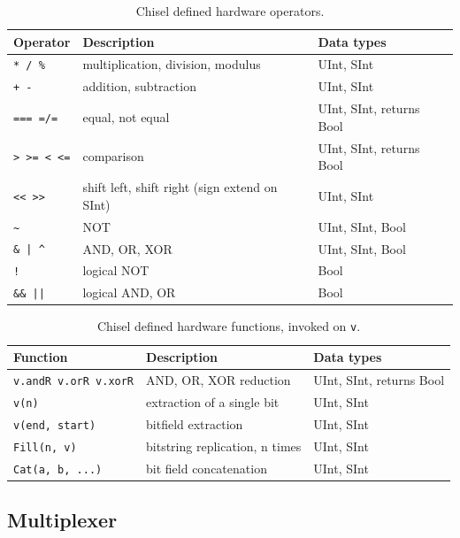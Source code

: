 \documentclass[%
    10pt,
    headinclude, footexclude,
    openright, %
    notitlepage,
    cleardoubleempty,
    headsepline,
    pointlessnumbers,
    bibtotoc, idxtotoc,
    ]{scrbook}
\newcommand{\code}[1]{{\small{\texttt{#1}}}}
\begin{document}
\begin{table}
 \centering
 \label{tab:operators}
  \begin{tabular}{lll}
    \toprule
    Operator & Description & Data types \\
    \midrule
    \code{* / \%} & multiplication, division, modulus & UInt, SInt \\
    \code{+ -} & addition, subtraction & UInt, SInt \\
    \code{=== =/=} & equal, not equal & UInt, SInt, returns Bool \\
    \code{> >= < <=} & comparison & UInt, SInt, returns Bool \\
    \code{<< >>} & shift left, shift right (sign extend on SInt) & UInt, SInt \\
    \code{\~} & NOT & UInt, SInt, Bool \\
    \code{\& | \^} & AND, OR, XOR & UInt, SInt, Bool \\
    \code{!} & logical NOT & Bool \\
    \code{\&\& ||} & logical AND, OR & Bool \\
    \bottomrule 
  \end{tabular} 
  \caption{Chisel defined hardware operators.}
\end{table}

\begin{table}
 \centering
 \label{tab:functions}
  \begin{tabular}{lll}
    \toprule
    Function & Description & Data types \\
    \midrule
    \code{v.andR v.orR v.xorR} & AND, OR, XOR reduction & UInt, SInt, returns Bool \\
    \code{v(n)} & extraction of a single bit & UInt, SInt \\
    \code{v(end, start)} & bitfield extraction & UInt, SInt \\
    \code{Fill(n, v)} & bitstring replication, n times & UInt, SInt \\
    \code{Cat(a, b, ...)} & bit field concatenation & UInt, SInt \\
    \bottomrule 
  \end{tabular} 
  \caption{Chisel defined hardware functions, invoked on \code{v}.}
\end{table}                                            
    

\subsection{Multiplexer}
\end{document}
